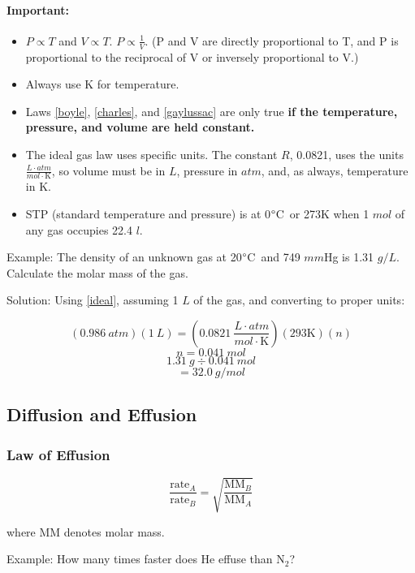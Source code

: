 \documentclass[a4paper, 12pt]{article}
\newcommand{\degC}{$\degree$C \,}
\newcommand{\R}{\left(0.0821 \: \frac{L \cdot atm}{mol \cdot \text{K}}\right)}
\begin{document}
\paragraph{Important:}

\begin{itemize}[leftmargin=*, nosep]
    \item $P \propto T$ and $V \propto T$. $P \propto \frac{1}{V}$. (P and V are directly proportional to T, and P is proportional to the reciprocal of V or inversely proportional to V.)
    \item Always use K for temperature.
    \item Laws \ref{boyle}, \ref{charles}, and \ref{gaylussac} are only true \textbf{if the temperature, pressure, and volume are held constant.}
    \item The ideal gas law uses specific units. The constant $R$, 0.0821, uses the units $\frac{L \cdot atm}{mol \cdot \text{K}}$, so volume must be in $L$, pressure in $atm$, and, as always, temperature in K.
    \item STP (standard temperature and pressure) is at 0\degC or 273K when 1 $mol$ of any gas occupies 22.4 $l$.
\end{itemize}

Example: The density of an unknown gas at 20\degC and 749 $mm$Hg is 1.31 $g/L$. Calculate the molar mass of the gas.

Solution: Using \ref{ideal}, assuming 1 $L$ of the gas, and converting to proper units:

$$(0.986 \: atm)(1 \: L) = \R (293\text{K})(n)$$
$$n = 0.041 \: mol$$
$$1.31 \: g \div 0.041 \: mol$$
$$=\boxed{32.0 \: g/mol}$$

\subsection*{Diffusion and Effusion}

\subsubsection*{Law of Effusion}

\begin{equation}\label{effusion}
    \frac{\text{rate}_A}{\text{rate}_B} = \sqrt{\frac{\text{MM}_B}{\text{MM}_A}}
\end{equation}

where MM denotes molar mass.

Example: How many times faster does He effuse than N$_2$?
\end{document}
